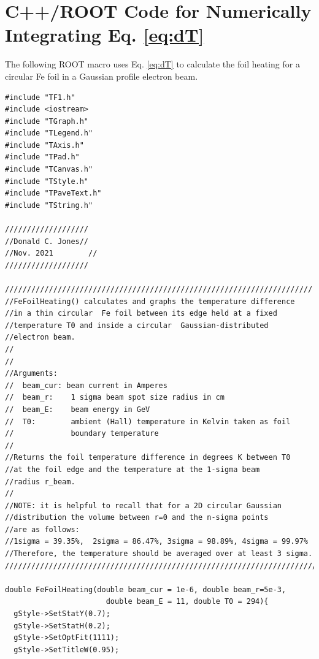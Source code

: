 \documentclass[12pt]{article}
\begin{document}
\section{C++/ROOT Code for Numerically Integrating Eq. \ref{eq:dT}}
The following ROOT macro uses Eq. \ref{eq:dT} to calculate the foil heating for a circular Fe foil in a Gaussian profile electron beam.
\begin{lstlisting}
#include "TF1.h"
#include <iostream>
#include "TGraph.h"
#include "TLegend.h"
#include "TAxis.h"
#include "TPad.h"
#include "TCanvas.h"
#include "TStyle.h"
#include "TPaveText.h"
#include "TString.h"

///////////////////
//Donald C. Jones//
//Nov. 2021        //
///////////////////

//////////////////////////////////////////////////////////////////////
//FeFoilHeating() calculates and graphs the temperature difference 
//in a thin circular  Fe foil between its edge held at a fixed 
//temperature T0 and inside a circular  Gaussian-distributed 
//electron beam.                                                 
//     
//                                                                               
//Arguments:                                                                         
//  beam_cur: beam current in Amperes                                                
//  beam_r:    1 sigma beam spot size radius in cm                                    
//  beam_E:    beam energy in GeV                                                      
//  T0:        ambient (Hall) temperature in Kelvin taken as foil 
//             boundary temperature 
//                                                                              
//Returns the foil temperature difference in degrees K between T0
//at the foil edge and the temperature at the 1-sigma beam 
//radius r_beam.       
//                       
//NOTE: it is helpful to recall that for a 2D circular Gaussian 
//distribution the volume between r=0 and the n-sigma points 
//are as follows:                           
//1sigma = 39.35%,  2sigma = 86.47%, 3sigma = 98.89%, 4sigma = 99.97%
//Therefore, the temperature should be averaged over at least 3 sigma.    
/////////////////////////////////////////////////////////////////////////

double FeFoilHeating(double beam_cur = 1e-6, double beam_r=5e-3, 
                       double beam_E = 11, double T0 = 294){
  gStyle->SetStatY(0.7);
  gStyle->SetStatH(0.2);
  gStyle->SetOptFit(1111);
  gStyle->SetTitleW(0.95);



\end{lstlisting}
\end{document}
